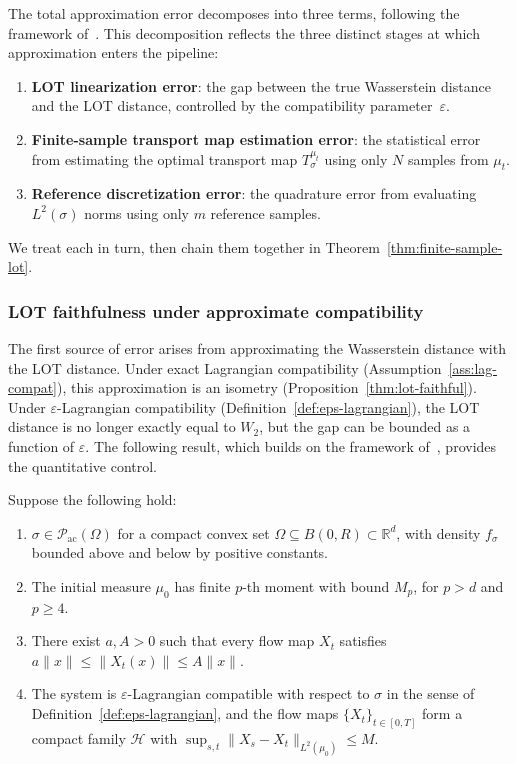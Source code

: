 \documentclass[11pt]{article}
\newcommand{\R}{\mathbb{R}}
\newcommand{\1}{\mathbf{1}}
\begin{document}
The total approximation error decomposes into three terms, following the framework of~\cite{cloninger2023lotwassmap}. This decomposition reflects the three distinct stages at which approximation enters the pipeline:
\begin{enumerate}
    \item \textbf{LOT linearization error}: the gap between the true Wasserstein
      distance and the LOT distance, controlled by the compatibility
      parameter~$\varepsilon$.
    \item \textbf{Finite-sample transport map estimation error}: the statistical
      error from estimating the optimal transport map $T_\sigma^{\mu_t}$
      using only $N$ samples from $\mu_t$.
    \item \textbf{Reference discretization error}: the quadrature error from
      evaluating $L^2(\sigma)$ norms using only $m$ reference samples.
\end{enumerate}
We treat each in turn, then chain them together in Theorem~\ref{thm:finite-sample-lot}. 


\subsubsection{LOT faithfulness under approximate compatibility}

The first source of error arises from approximating the Wasserstein distance with the LOT distance. Under exact Lagrangian compatibility (Assumption~\ref{ass:lag-compat}), this approximation is an isometry (Proposition~\ref{thm:lot-faithful}). Under $\varepsilon$-Lagrangian compatibility (Definition~\ref{def:eps-lagrangian}), the LOT distance is no longer exactly equal to $W_2$, but the gap can be bounded as a function of $\varepsilon$.  The following result, which builds on the framework of~\cite{cloninger2023lotwassmap}, provides the quantitative control.

\begin{assumption}\label{ass:regularity}
Suppose the following hold:
\begin{enumerate}[label=(\roman*)]
  \item $\sigma \in \mathcal{P}_{\mathrm{ac}}(\Omega)$ for a compact convex
        set $\Omega \subseteq B(0,R) \subset \R^d$, with density $f_\sigma$
        bounded above and below by positive constants.
  \item The initial measure $\mu_0$ has finite $p$-th moment with bound
        $M_p$, for $p > d$ and $p \geq 4$.
  \item There exist $a, A > 0$ such that every flow map $X_t$ satisfies
        $a\|x\| \leq \|X_t(x)\| \leq A\|x\|$.
  \item The system is $\varepsilon$-Lagrangian compatible with respect to
        $\sigma$ in the sense of Definition~\ref{def:eps-lagrangian}, and
        the flow maps $\{X_t\}_{t \in [0,T]}$ form a compact family
        $\mathcal{H}$ with
        $\sup_{s,t} \|X_s - X_t\|_{L^2(\mu_0)} \leq M$. \\
\end{enumerate}
\end{assumption}
\end{document}
